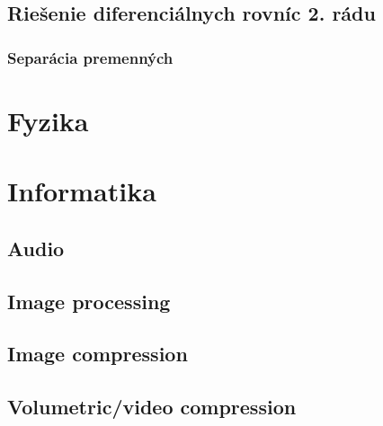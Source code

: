     \subsection{Riešenie diferenciálnych rovníc 2. rádu}    
        \subsubsection{Separácia premenných}
    
         
\section{Fyzika}
    
    
    
    
\section{Informatika}
    
    \subsection{Audio}
    \subsection{Image processing}
    \subsection{Image compression}
    \subsection{Volumetric/video compression}
     
